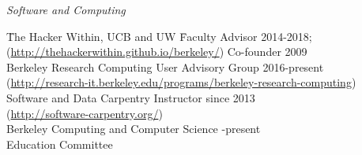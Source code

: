 \vspace*{-.5em}
\textit{Software and Computing}
\begin{tabbing}
%
\hspace*{2 em}\= The Hacker Within, UCB and UW \hspace*{8em} \= Faculty Advisor 2014-2018; \\
\> \hspace*{2 em}(\href{http://thehackerwithin.github.io/berkeley/}{http://thehackerwithin.github.io/berkeley/}) \> Co-founder 2009\\
%
\> Berkeley Research Computing  \> User Advisory Group 2016-present \\
\> \hspace*{2 em}(\href{http://research-it.berkeley.edu/programs/berkeley-research-computing}{http://research-it.berkeley.edu/programs/berkeley-research-computing})\\
%
\> Software and Data Carpentry  \> Instructor since 2013\\
\> \hspace*{2 em}(\href{http://software-carpentry.org/}{http://software-carpentry.org/})\\
%
%
\> Berkeley Computing and Computer Science -present \\
\> \hspace*{2 em}Education Committee%
\end{tabbing}


